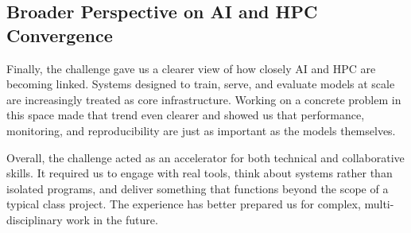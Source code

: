 \documentclass[11pt,a4paper]{article}
\begin{document}
\subsection{Broader Perspective on AI and HPC Convergence}

Finally, the challenge gave us a clearer view of how closely AI and HPC are becoming linked. Systems designed to train, serve, and evaluate models at scale are increasingly treated as core infrastructure. Working on a concrete problem in this space made that trend even clearer and showed us that performance, monitoring, and reproducibility are just as important as the models themselves.

Overall, the challenge acted as an accelerator for both technical and collaborative skills. It required us to engage with real tools, think about systems rather than isolated programs, and deliver something that functions beyond the scope of a typical class project. The experience has better prepared us for complex, multi-disciplinary work in the future.
\end{document}
